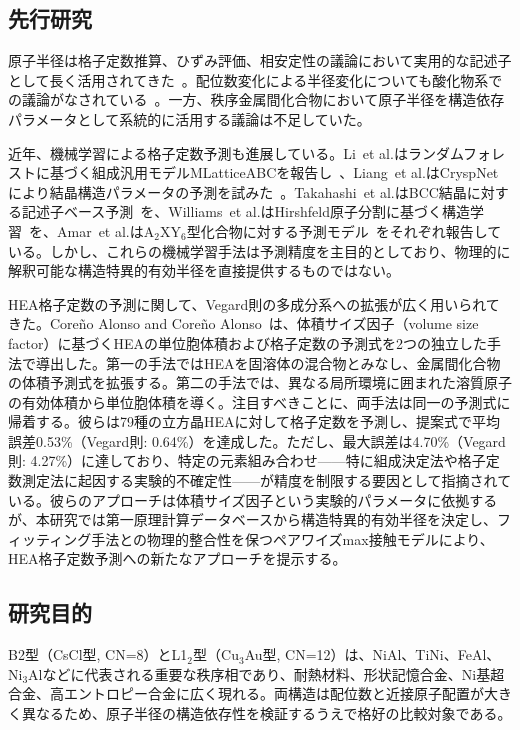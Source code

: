 \documentclass[a4paper,10pt,5p]{elsarticle}
\begin{document}
\subsection{先行研究}

原子半径は格子定数推算、ひずみ評価、相安定性の議論において実用的な記述子として長く活用されてきた~\cite{Sato2016GoldschmidtToleranceArbitraryIonic,Bartel2019NewToleranceFactor,Stein2021LavesPhasesReview,pauling1929,shannon1976}。配位数変化による半径変化についても酸化物系での議論がなされている~\cite{shannon1976,pauling1929,okamoto1988}。一方、秩序金属間化合物において原子半径を構造依存パラメータとして系統的に活用する議論は不足していた。

近年、機械学習による格子定数予測も進展している。Li~et al.はランダムフォレストに基づく組成汎用モデルMLatticeABCを報告し~\cite{Mlatticeabc}、Liang~et al.はCryspNetにより結晶構造パラメータの予測を試みた~\cite{liang2020cryspnet}。Takahashi~et al.はBCC結晶に対する記述子ベース予測~\cite{takahashi2017bcc}を、Williams~et al.はHirshfeld原子分割に基づく構造学習~\cite{williams2020hirshfeld}を、Amar~et al.はA$_2$XY$_6$型化合物に対する予測モデル~\cite{amar2020a2xy6}をそれぞれ報告している。しかし、これらの機械学習手法は予測精度を主目的としており、物理的に解釈可能な構造特異的有効半径を直接提供するものではない。

HEA格子定数の予測に関して、Vegard則の多成分系への拡張が広く用いられてきた。Coreño Alonso and Coreño Alonso~\cite{Alonso2021}は、体積サイズ因子（volume size factor）に基づくHEAの単位胞体積および格子定数の予測式を2つの独立した手法で導出した。第一の手法ではHEAを固溶体の混合物とみなし、金属間化合物の体積予測式を拡張する。第二の手法では、異なる局所環境に囲まれた溶質原子の有効体積から単位胞体積を導く。注目すべきことに、両手法は同一の予測式に帰着する。彼らは79種の立方晶HEAに対して格子定数を予測し、提案式で平均誤差0.53\%（Vegard則: 0.64\%）を達成した。ただし、最大誤差は4.70\%（Vegard則: 4.27\%）に達しており、特定の元素組み合わせ——特に組成決定法や格子定数測定法に起因する実験的不確定性——が精度を制限する要因として指摘されている。彼らのアプローチは体積サイズ因子という実験的パラメータに依拠するが、本研究では第一原理計算データベースから構造特異的有効半径を決定し、フィッティング手法との物理的整合性を保つペアワイズmax接触モデルにより、HEA格子定数予測への新たなアプローチを提示する。


\subsection{研究目的}
B2型（CsCl型, CN=8）とL1$_2$型（Cu$_3$Au型, CN=12）は、NiAl、TiNi、FeAl、Ni$_3$Alなどに代表される重要な秩序相であり、耐熱材料、形状記憶合金、Ni基超合金、高エントロピー合金に広く現れる。両構造は配位数と近接原子配置が大きく異なるため、原子半径の構造依存性を検証するうえで格好の比較対象である。
\end{document}
